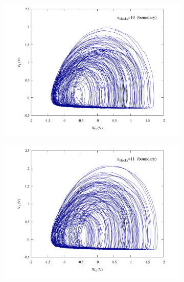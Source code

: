 \begin{figure}
    \centering
    \begin{minipage}{.47\textwidth}
        \begin{subfigure}{\linewidth}
            \centering
            \includegraphics[width=\linewidth]
            {../blocks/10_blocks/attractor.pdf}
        \end{subfigure}
    \end{minipage}
    \begin{minipage}{.47\textwidth}
        \begin{subfigure}{\linewidth}
            \centering
            \includegraphics[width=\linewidth]
            {../blocks/11_blocks/edge/attractor.pdf}

\end{subfigure}
\end{minipage}
\end{figure}
